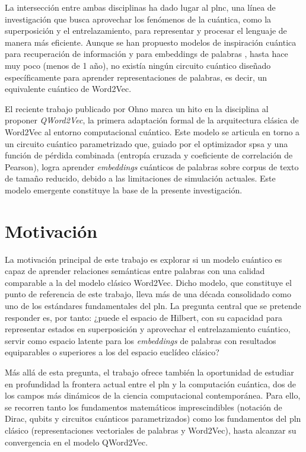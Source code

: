 La intersección entre ambas disciplinas ha dado lugar al \gls{plnc}, una línea de investigación que busca aprovechar los fenómenos de la cuántica, como la superposición y el entrelazamiento, para representar y procesar el lenguaje de manera más eficiente. Aunque se han propuesto modelos de inspiración cuántica para recuperación de información \cite{xie_quantum_language_2015, zhang_quantum_qa_2018} y para embeddings de palabras \cite{li_quantum_word_embedding_2018}, hasta hace muy poco (menos de 1 año), no existía ningún circuito cuántico diseñado específicamente para aprender representaciones de palabras, es decir, un equivalente cuántico de Word2Vec.

El reciente trabajo publicado por Ohno \cite{ohno_qword2vec_2025} marca un hito en la disciplina al proponer \textit{QWord2Vec}, la primera adaptación formal de la arquitectura clásica de Word2Vec al entorno computacional cuántico. Este modelo se articula en torno a un circuito cuántico parametrizado que, guiado por el optimizador \gls{spsa} \cite{spall_spsa_1998} y una función de pérdida combinada (entropía cruzada y coeficiente de correlación de Pearson), logra aprender \textit{embeddings} cuánticos de palabras sobre corpus de texto de tamaño reducido, debido a las limitaciones de simulación actuales. Este modelo emergente constituye la base de la presente investigación.

\section{Motivación}

La motivación principal de este trabajo es explorar si un modelo cuántico es capaz de aprender relaciones semánticas entre palabras con una calidad comparable a la del modelo clásico Word2Vec. Dicho modelo, que constituye el punto de referencia de este trabajo, lleva más de una década consolidado como uno de los estándares fundamentales del \gls{pln}. La pregunta central que se pretende responder es, por tanto: ¿puede el espacio de Hilbert, con su capacidad para representar estados en superposición y aprovechar el entrelazamiento cuántico, servir como espacio latente para los \textit{embeddings} de palabras con resultados equiparables o superiores a los del espacio euclídeo clásico?

Más allá de esta pregunta, el trabajo ofrece también la oportunidad de estudiar en profundidad la frontera actual entre el \gls{pln} y la computación cuántica, dos de los campos más dinámicos de la ciencia computacional contemporánea. Para ello, se recorren tanto los fundamentos matemáticos imprescindibles (notación de Dirac, qubits y circuitos cuánticos parametrizados) como los fundamentos del \gls{pln} clásico (representaciones vectoriales de palabras y Word2Vec), hasta alcanzar su convergencia en el modelo QWord2Vec.


